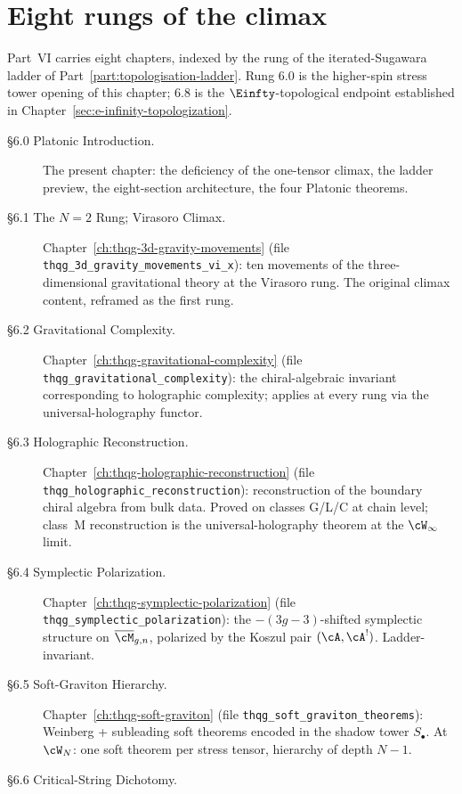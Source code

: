 \section{Eight rungs of the climax}
\label{sec:part-vi-eight-sections}

Part~VI carries eight chapters, indexed by the rung of the
iterated-Sugawara ladder of Part~\ref{part:topologisation-ladder}.
Rung $6.0$ is the higher-spin stress tower opening of this chapter;
$6.8$ is the $\Einfty$-topological endpoint established in
Chapter~\ref{sec:e-infinity-topologization}.

\begin{description}
 \item[\S6.0 Platonic Introduction.] The present chapter: the
 deficiency of the one-tensor climax, the ladder preview, the
 eight-section architecture, the four Platonic theorems.
 \item[\S6.1 The $N=2$ Rung; Virasoro Climax.]
 \label{sec:part-vi-6-1}
 Chapter~\ref{ch:thqg-3d-gravity-movements} (file
 \texttt{thqg\_3d\_gravity\_movements\_vi\_x}): ten movements of the
 three-dimensional gravitational theory at the Virasoro rung. The
 original climax content, reframed as the first rung.
 \item[\S6.2 Gravitational Complexity.]
 Chapter~\ref{ch:thqg-gravitational-complexity} (file
 \texttt{thqg\_gravitational\_complexity}): the chiral-algebraic
 invariant corresponding to holographic complexity; applies at every
 rung via the universal-holography functor.
 \item[\S6.3 Holographic Reconstruction.]
 Chapter~\ref{ch:thqg-holographic-reconstruction} (file
 \texttt{thqg\_holographic\_reconstruction}): reconstruction of the
 boundary chiral algebra from bulk data. Proved on classes G/L/C at
 chain level; class~M reconstruction is the universal-holography theorem
 at the $\cW_\infty$ limit.
 \item[\S6.4 Symplectic Polarization.]
 Chapter~\ref{ch:thqg-symplectic-polarization} (file
 \texttt{thqg\_symplectic\_polarization}): the $-(3g-3)$-shifted
 symplectic structure on $\overline{\cM}_{g,n}$, polarized by the
 Koszul pair $(\cA, \cA^!)$. Ladder-invariant.
 \item[\S6.5 Soft-Graviton Hierarchy.]
 Chapter~\ref{ch:thqg-soft-graviton} (file
 \texttt{thqg\_soft\_graviton\_theorems}): Weinberg + subleading soft
 theorems encoded in the shadow tower $S_\bullet$. At $\cW_N$:
 one soft theorem per stress tensor, hierarchy of depth $N-1$.
 \item[\S6.6 Critical-String Dichotomy.]

\end{description}
